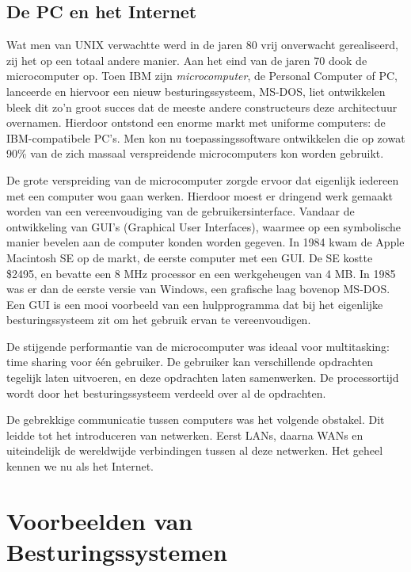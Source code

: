 \subsection{De PC en het Internet}

Wat men van UNIX verwachtte werd in de jaren 80 vrij onverwacht
gerealiseerd, zij het op een totaal andere manier. Aan het eind van
de jaren 70 dook de microcomputer op. Toen IBM zijn
\emph{microcomputer}, de Personal Computer of PC,
lanceerde en hiervoor een nieuw besturingssysteem, MS-DOS, liet
ontwikkelen bleek dit zo'n groot succes dat de meeste andere
constructeurs deze architectuur overnamen. Hierdoor ontstond een
enorme markt met uniforme computers: de IBM-compatibele PC's. Men kon
nu toepassingssoftware ontwikkelen die op zowat 90\% van de zich
massaal verspreidende microcomputers kon worden gebruikt.

De grote verspreiding van de microcomputer zorgde ervoor dat
eigenlijk iedereen met een computer wou gaan werken. Hierdoor moest er
dringend werk gemaakt worden van een vereenvoudiging van de
gebruikersinterface. Vandaar de ontwikkeling van GUI's (Graphical User
Interfaces), waarmee op een symbolische manier bevelen aan de computer
konden worden gegeven. In 1984 kwam de Apple Macintosh SE op de markt,
de eerste computer met een GUI. De SE kostte \$2495, en bevatte een 8
MHz processor en een werkgeheugen van 4 MB. In 1985 was er dan de
eerste versie van Windows, een grafische laag bovenop MS-DOS. Een GUI
is een mooi voorbeeld van een hulpprogramma dat bij het eigenlijke
besturingssysteem zit om het gebruik ervan te vereenvoudigen.

De stijgende performantie van de microcomputer was ideaal voor
multitasking: time sharing voor \'e\'en gebruiker. De gebruiker kan
verschillende opdrachten tegelijk laten uitvoeren, en deze opdrachten
laten samenwerken. De processortijd wordt door het besturingssysteem
verdeeld over al de opdrachten.

De gebrekkige communicatie tussen computers was het volgende
obstakel. Dit leidde tot het introduceren van netwerken. Eerst LANs,
daarna WANs en uiteindelijk de wereldwijde verbindingen tussen al deze
netwerken. Het geheel kennen we nu als het Internet.

\section{Voorbeelden van Besturingssystemen}

